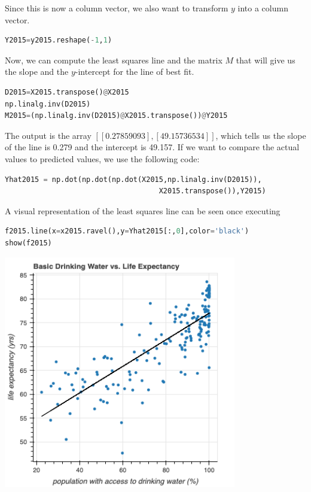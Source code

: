 \documentclass[12pt]{article}
\begin{document}
\noindent
Since this is now a column vector, we also want to transform $y$ into a column vector.
\begin{lstlisting}[language=Python]
Y2015=y2015.reshape(-1,1)
\end{lstlisting}

\noindent
Now, we can compute the least squares line and the matrix $M$ that will give us the slope and the $y$-intercept for the line of best fit.
\begin{lstlisting}[language=Python]
D2015=X2015.transpose()@X2015
np.linalg.inv(D2015)
M2015=(np.linalg.inv(D2015)@X2015.transpose())@Y2015
\end{lstlisting}

\noindent
The output is the array $[[0.27859093],[49.15736534]]$, which tells us the slope of the line is 0.279 and the intercept is 49.157. If we want to compare the actual values to predicted values, we use the following code:
\begin{lstlisting}[language=Python]
Yhat2015 = np.dot(np.dot(np.dot(X2015,np.linalg.inv(D2015)),
                                    X2015.transpose()),Y2015)
\end{lstlisting}

\noindent
A visual representation of the least squares line can be seen once executing
\begin{lstlisting}[language=Python]
f2015.line(x=x2015.ravel(),y=Yhat2015[:,0],color='black')
show(f2015)
\end{lstlisting}

\begin{center}
\includegraphics[width=4in]{Figures/figure2.png}\\
\end{center}
\end{document}
